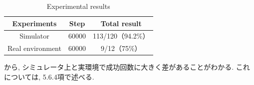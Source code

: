 \begin{table}[hbtp]
  \caption{Experimental results}
  \label{table:result_real_60000}
  \centering
  \begin{tabular}{|c|c|c|}
    \hline
    Experiments & Step & Total result\\
    \hline
    Simulator & 60000 & 113/120（94.2\%）\\
    \hline
    Real environment & 60000 & 9/12（75\%）\\
    \hline
  \end{tabular}
\end{table}

から, シミュレータ上と実環境で成功回数に大きく差があることがわかる. これについては, 5.6.4項で述べる.


  

  





